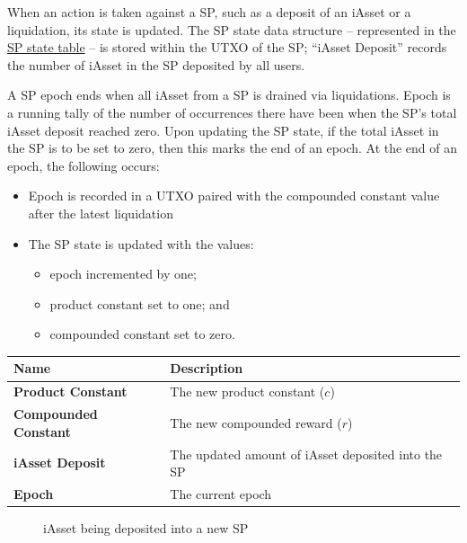 \documentclass{article}
\begin{document}
\begin{sloppypar}
When an action is taken against a SP, such as a deposit of an iAsset or
a liquidation, its state is updated. The SP state data structure --
represented in the \protect\hyperlink{stability-pool-state}{SP state
table} -- is stored within the UTXO of the SP; ``iAsset Deposit''
records the number of iAsset in the SP deposited by all users.

A SP epoch ends when all iAsset from a SP is drained via liquidations.
Epoch is a running tally of the number of occurrences there have been
when the SP's total iAsset deposit reached zero. Upon updating the SP
state, if the total iAsset in the SP is to be set to zero, then this
marks the end of an epoch. At the end of an epoch, the following occurs:

\begin{itemize}
\item
  Epoch is recorded in a UTXO paired with the compounded constant value
  after the latest liquidation
\item
  The SP state is updated with the values:

  \begin{itemize}
  \item
    epoch incremented by one;
  \item
    product constant set to one; and
  \item
    compounded constant set to zero.
  \end{itemize}
\end{itemize}

\hypertarget{stability-pool-state}{}

\begin{tabularx}{\linewidth}{l|l}
\caption{State stored upon updates to a SP}
\tabularnewline
\toprule
\textbf{Name} & \textbf{Description}
\tabularnewline
\midrule
\endhead
\textbf{Product Constant} & The new product constant
(\(c\))
\tabularnewline
\midrule
\textbf{Compounded Constant} & The new compounded reward
(\(r\))
\tabularnewline
\midrule
\textbf{iAsset Deposit} & The updated amount of iAsset deposited into
the SP
\tabularnewline
\midrule
\textbf{Epoch} & The current epoch
\tabularnewline
\bottomrule
\end{tabularx}

\hypertarget{stability-deposits}{%
\begin{figure}[htbp]
\centering

\caption{iAsset being deposited into a new SP}
\label{stability-deposits}
\end{figure}}


\end{sloppypar}
\end{document}
